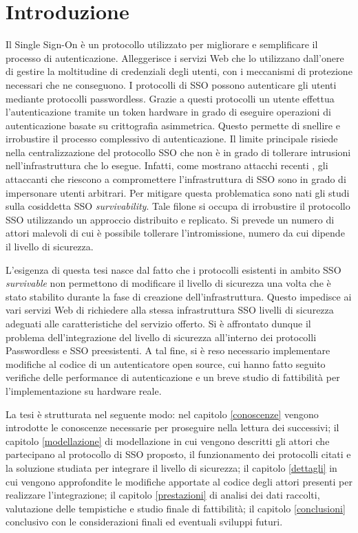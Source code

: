 \chapter{Introduzione}
\label{intro}

Il Single Sign-On è un protocollo utilizzato per migliorare e semplificare il processo di autenticazione. Alleggerisce i servizi Web che lo utilizzano dall'onere di gestire la moltitudine di credenziali degli utenti, con i meccanismi di protezione necessari che ne conseguono. I protocolli di SSO possono autenticare gli utenti mediante protocolli passwordless. Grazie a questi protocolli un utente effettua l'autenticazione tramite un token hardware in grado di eseguire operazioni di autenticazione basate su crittografia asimmetrica. Questo permette di snellire e irrobustire il processo complessivo di autenticazione. Il limite principale risiede nella centralizzazione del protocollo SSO che non è in grado di tollerare intrusioni nell'infrastruttura che lo esegue.
Infatti, come mostrano attacchi recenti \cite{volexity:solarwinds} \cite{nsa:authentication}, gli attaccanti che riescono a compromettere l'infrastruttura di SSO sono in grado di impersonare utenti arbitrari.
Per mitigare questa problematica sono nati gli studi sulla cosiddetta SSO \emph{survivability}. Tale filone si occupa di irrobustire il protocollo SSO utilizzando un approccio distribuito e replicato. Si prevede un numero di attori malevoli di cui è possibile tollerare l'intromissione, numero da cui dipende il livello di sicurezza.

L'esigenza di questa tesi nasce dal fatto che i protocolli esistenti in ambito SSO \emph{survivable} non permettono di modificare il livello di sicurezza una volta che è stato stabilito durante la fase di creazione dell'infrastruttura. Questo impedisce ai vari servizi Web di richiedere alla stessa infrastruttura SSO livelli di sicurezza adeguati alle caratteristiche del servizio offerto. Si è affrontato dunque il problema dell'integrazione del livello di sicurezza all'interno dei protocolli Passwordless e SSO preesistenti. A tal fine, si è reso necessario implementare modifiche al codice di un autenticatore open source, cui hanno fatto seguito verifiche delle performance di autenticazione e un breve studio di fattibilità per l'implementazione su hardware reale.

La tesi è strutturata nel seguente modo: nel capitolo \ref{conoscenze} vengono introdotte le conoscenze necessarie per proseguire nella lettura dei successivi; il capitolo \ref{modellazione} di modellazione in cui vengono descritti gli attori che partecipano al protocollo di SSO proposto, il funzionamento dei protocolli citati e la soluzione studiata per integrare il livello di sicurezza; il capitolo \ref{dettagli} in cui vengono approfondite le modifiche apportate al codice degli attori presenti per realizzare l'integrazione; il capitolo \ref{prestazioni} di analisi dei dati raccolti, valutazione delle tempistiche e studio finale di fattibilità; il capitolo \ref{conclusioni} conclusivo con le considerazioni finali ed eventuali sviluppi futuri.

